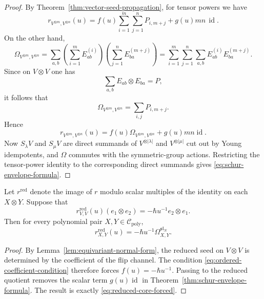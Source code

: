 \begin{proof}
By Theorem~\ref{thm:vector-seed-propagation}, for tensor powers we have
\begin{equation}
r_{V^{\otimes m},V^{\otimes n}}(u)
=
f(u)\sum_{i=1}^{m}\sum_{j=1}^{n}P_{i,m+j}
+g(u)mn\,\operatorname{id}.
\end{equation}
On the other hand,
\begin{equation}
\Omega_{V^{\otimes m},V^{\otimes n}}
=
\sum_{a,b}\left(\sum_{i=1}^{m}E_{ab}^{(i)}\right)
\left(\sum_{j=1}^{n}E_{ba}^{(m+j)}\right)
=
\sum_{i=1}^{m}\sum_{j=1}^{n} \sum_{a,b}E_{ab}^{(i)}E_{ba}^{(m+j)}.
\end{equation}
Since on $V\otimes V$ one has
\begin{equation}
\sum_{a,b}E_{ab}\otimes E_{ba}=P,
\end{equation}
it follows that
\begin{equation}
\Omega_{V^{\otimes m},V^{\otimes n}}=\sum_{i,j}P_{i,m+j}.
\end{equation}
Hence
\begin{equation}
r_{V^{\otimes m},V^{\otimes n}}(u)
=
f(u)\Omega_{V^{\otimes m},V^{\otimes n}}+g(u)mn\operatorname{id}.
\end{equation}
Now $S_\lambda V$ and $S_\mu V$ are direct summands of
$V^{\otimes |\lambda|}$ and $V^{\otimes |\mu|}$ cut out by Young
idempotents, and $\Omega$ commutes with the symmetric-group actions.
Restricting the tensor-power identity to the corresponding direct summands
gives \eqref{eq:schur-envelope-formula}.
\end{proof}

\begin{corollary}
\ClaimStatusProvedHere
\label{cor:one-coefficient-forces-reduced-core}
Let $r^{\mathrm{red}}$ denote the image of $r$ modulo scalar multiples of
the identity on each $X\otimes Y$.  Suppose that
\begin{equation}
\label{eq:ordered-coefficient-condition}
r^{\mathrm{red}}_{V,V}(u)(e_1\otimes e_2)
=
-\hbar u^{-1}e_2\otimes e_1.
\end{equation}
Then for every polynomial pair $X,Y\in \mathcal C_{\mathrm{poly}}$,
\begin{equation}
\label{eq:reduced-core-forced}
r^{\mathrm{red}}_{X,Y}(u)
=
-\hbar u^{-1}\Omega^{\mathfrak{sl}_N}_{X,Y}.
\end{equation}
\end{corollary}

\begin{proof}
By Lemma~\ref{lem:equivariant-normal-form}, the reduced seed on
$V\otimes V$ is determined by the coefficient of the flip channel.  The
condition \eqref{eq:ordered-coefficient-condition} therefore forces
$f(u)=-\hbar u^{-1}$.  Passing to the reduced quotient removes the scalar
term $g(u)\operatorname{id}$ in
Theorem~\ref{thm:schur-envelope-formula}.  The result is exactly
\eqref{eq:reduced-core-forced}.
\end{proof}

